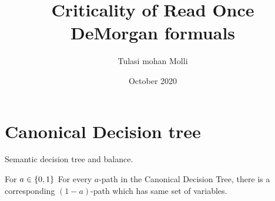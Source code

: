 \documentclass{article}
\title{Criticality of Read Once DeMorgan formuals}
\author{Tulasi mohan Molli}
\date{October 2020}
\begin{document}
\maketitle

\section{Canonical Decision tree}
    

\begin{definition}[CDT]
    Semantic decision tree and balance.    
\end{definition}

\begin{observation}
    For $a \in \{0,1\}^{}$ For every $a$-path in the Canonical Decision Tree, there is a corresponding $(1-a)$-path which has same set of variables. 
\end{observation}
\end{document}
